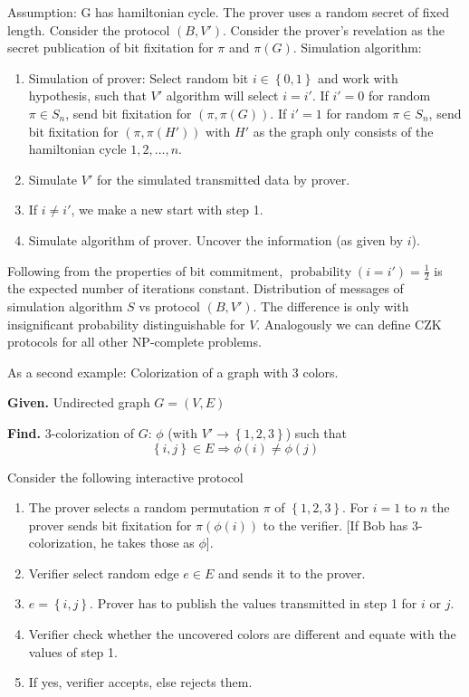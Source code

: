 \documentclass[a4paper]{article}
\newcommand{\given}[1]{\textbf{Given.} #1\par}
\newcommand{\find}[1]{\textbf{Find.} #1\par}
\newcommand{\cls}[1]{\rm{#1}}
\newcommand{\set}[1]{\left\{#1\right\}}
\newenvironment{spec}[0]{\begin{framed}}{\end{framed}}
\DeclareMathOperator{\prop}{probability}
\begin{document}
Assumption: G has hamiltonian cycle. The prover uses a random
secret of fixed length. Consider the protocol $(B, V')$.
Consider the prover's revelation as the secret publication of bit fixitation
for $\pi$ and $\pi(G)$. Simulation algorithm:
\begin{enumerate}
  \item
    Simulation of prover: Select random bit $i \in \set{0,1}$ and
    work with hypothesis, such that $V'$ algorithm will select $i = i'$.
    If $i' = 0$ for random $\pi \in S_n$, send bit fixitation for $(\pi, \pi(G))$.
    If $i' = 1$ for random $\pi \in S_n$, send bit fixitation for $(\pi, \pi(H'))$
    with $H'$ as the graph only consists of the hamiltonian cycle $1, 2, \ldots, n$.
  \item
    Simulate $V'$ for the simulated transmitted data by prover.
  \item If $i \neq i'$, we make a new start with step 1.
  \item Simulate algorithm of prover. Uncover the information (as given by $i$).
\end{enumerate}
Following from the properties of bit commitment, $\prop(i
= i') = \frac12$ is the expected number of iterations constant. Distribution
of messages of simulation algorithm $S$ vs protocol $(B, V')$.
The difference is only with insignificant probability distinguishable for $V$.
Analogously we can define CZK protocols for all other \cls{NP}-complete problems.

As a second example:
Colorization of a graph with 3 colors.
\begin{spec}
  \given{Undirected graph $G = (V, E)$}
  \find{3-colorization of $G$: $\phi$ (with $V' \rightarrow \set{1,2,3}$) such that
    \[ \set{i,j} \in E \Rightarrow \phi(i) \neq \phi(j) \]
  }
\end{spec}

Consider the following interactive protocol
\begin{enumerate}
  \item
    The prover selects a random permutation $\pi$ of $\set{1,2,3}$.
    For $i = 1$ to $n$ the prover sends bit fixitation for
    $\pi(\phi(i))$ to the verifier. [If Bob has 3-colorization,
    he takes those as $\phi$].
  \item Verifier select random edge $e \in E$ and sends it to the prover.
  \item
    $e = \set{i, j}$. Prover has to publish the values transmitted
    in step 1 for $i$ or $j$.
  \item
    Verifier check whether the uncovered colors are different and
    equate with the values of step 1.
  \item If yes, verifier accepts, else rejects them.
\end{enumerate}
\end{document}
